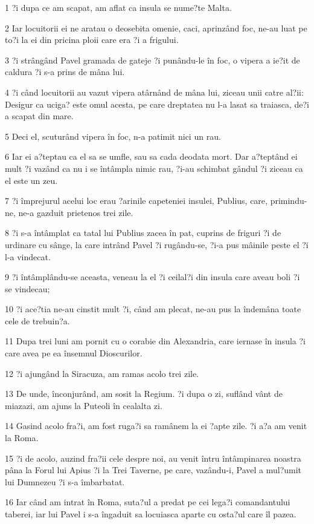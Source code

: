 \par 1 ?i dupa ce am scapat, am aflat ca insula se nume?te Malta.
\par 2 Iar locuitorii ei ne aratau o deosebita omenie, caci, aprinzând foc, ne-au luat pe to?i la ei din pricina ploii care era ?i a frigului.
\par 3 ?i strângând Pavel gramada de gateje ?i punându-le în foc, o vipera a ie?it de caldura ?i s-a prins de mâna lui.
\par 4 ?i când locuitorii au vazut vipera atârnând de mâna lui, ziceau unii catre al?ii: Desigur ca uciga? este omul acesta, pe care dreptatea nu l-a lasat sa traiasca, de?i a scapat din mare.
\par 5 Deci el, scuturând vipera în foc, n-a patimit nici un rau.
\par 6 Iar ei a?teptau ca el sa se umfle, sau sa cada deodata mort. Dar a?teptând ei mult ?i vazând ca nu i se întâmpla nimic rau, ?i-au schimbat gândul ?i ziceau ca el este un zeu.
\par 7 ?i împrejurul acelui loc erau ?arinile capeteniei insulei, Publius, care, primindu-ne, ne-a gazduit prietenos trei zile.
\par 8 ?i s-a întâmplat ca tatal lui Publius zacea în pat, cuprins de friguri ?i de urdinare cu sânge, la care intrând Pavel ?i rugându-se, ?i-a pus mâinile peste el ?i l-a vindecat.
\par 9 ?i întâmplându-se aceasta, veneau la el ?i ceilal?i din insula care aveau boli ?i se vindecau;
\par 10 ?i ace?tia ne-au cinstit mult ?i, când am plecat, ne-au pus la îndemâna toate cele de trebuin?a.
\par 11 Dupa trei luni am pornit cu o corabie din Alexandria, care iernase în insula ?i care avea pe ea însemnul Dioscurilor.
\par 12 ?i ajungând la Siracuza, am ramas acolo trei zile.
\par 13 De unde, înconjurând, am sosit la Regium. ?i dupa o zi, suflând vânt de miazazi, am ajuns la Puteoli în cealalta zi.
\par 14 Gasind acolo fra?i, am fost ruga?i sa ramânem la ei ?apte zile. ?i a?a am venit la Roma.
\par 15 ?i de acolo, auzind fra?ii cele despre noi, au venit întru întâmpinarea noastra pâna la Forul lui Apius ?i la Trei Taverne, pe care, vazându-i, Pavel a mul?umit lui Dumnezeu ?i s-a îmbarbatat.
\par 16 Iar când am intrat în Roma, suta?ul a predat pe cei lega?i comandantului taberei, iar lui Pavel i s-a îngaduit sa locuiasca aparte cu osta?ul care îl pazea.
